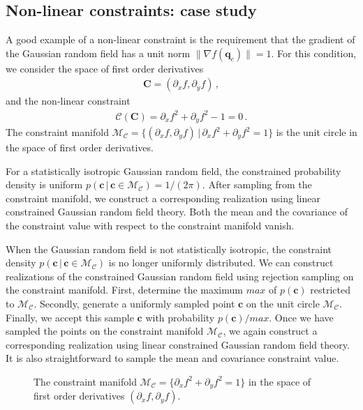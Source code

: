 \documentclass[a4paper, 11pt]{article}
\begin{document}
\subsection{Non-linear constraints: case study}
A good example of a non-linear constraint is the requirement that the gradient of the Gaussian random field has a unit norm $\|\nabla f(\bm{q}_c)\|=1$. For this condition, we consider the space of first order derivatives
\begin{align}
\bm{C}=(\partial_x f, \partial_y f)\,,
\end{align}
and the non-linear constraint 
\begin{align}
\mathcal{C}(\bm{C})=\partial_x f^2 +  \partial_y f^2 - 1=0\,.
\end{align}
The constraint manifold $\mathcal{M}_\mathcal{C}=\{(\partial_xf,\partial_yf)\, |\, \partial_xf^2+\partial_yf^2=1\}$ is the unit circle in the space of first order derivatives.

For a statistically isotropic Gaussian random field, the constrained probability density is uniform $p(\bm{c}\, |\, \bm{c}\in\mathcal{M}_\mathcal{C}) = 1/(2\pi)$. After sampling from the constraint manifold, we construct a corresponding realization using linear constrained Gaussian random field theory. Both the mean and the covariance of the constraint value with respect to the constraint manifold vanish.

When the Gaussian random field is not statistically isotropic, the constraint density $p(\bm{c}\, |\, \bm{c}\in\mathcal{M}_\mathcal{C})$ is no longer uniformly distributed. We can construct realizations of the constrained Gaussian random field using rejection sampling on the constraint manifold. First, determine the maximum $max$ of $p(\bm{c})$ restricted to $\mathcal{M}_\mathcal{C}$. Secondly, generate a uniformly sampled point $\bm{c}$ on the unit circle $\mathcal{M}_\mathcal{C}$. Finally, we accept this sample $\bm{c}$ with probability $p(\bm{c})/max$. Once we have sampled the points on the constraint manifold $\mathcal{M}_\mathcal{C}$, we again construct a corresponding realization using linear constrained Gaussian random field theory. It is also straightforward to sample the mean and covariance constraint value.



\begin{figure}
\centering
\begin{subfigure}[b]{0.49\textwidth}
\end{subfigure}
\caption{The constraint manifold $\mathcal{M}_\mathcal{C}=\{\partial_xf^2+\partial_yf^2=1\}$ in the space of first order derivatives $(\partial_x f,\partial_yf)$.}
\end{figure}
\end{document}
